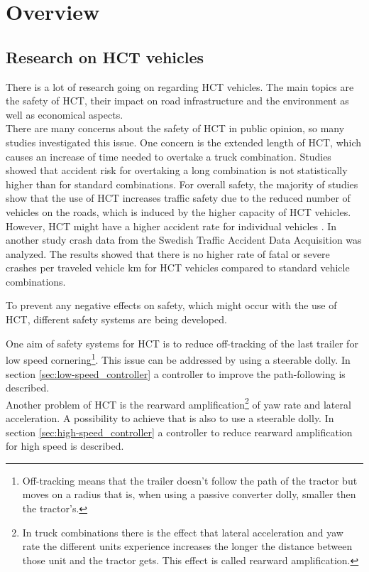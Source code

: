 \documentclass[ExampleMasters.tex]{subfiles}
\begin{document}
\clearpage
{\pagestyle{empty}\cleardoublepage}%
\chapter{Overview}
\label{chap:overview}


\section{Research on \acrlong{HCT} vehicles}
\label{sec:legal_situation}

There is a lot of research going on regarding \gls{HCT} vehicles. The main topics are the safety of \gls{HCT}, their impact on road infrastructure and the environment as well as economical aspects.\\
There are many concerns about the safety of \gls{HCT} in public opinion, so many studies investigated this issue. One concern is the extended length of \gls{HCT}, which causes an increase of time needed to overtake a truck combination. Studies showed that accident risk for overtaking a long combination is not statistically higher than for standard combinations\cite{EMS}.
For overall safety, the majority of studies show that the use of \gls{HCT} increases traffic safety due to the reduced number of vehicles on the roads, which is induced by the higher capacity of \gls{HCT} vehicles. However, \gls{HCT} might have a higher accident rate for individual vehicles \cite{EMS}. In another study crash data from the Swedish Traffic Accident Data Acquisition was analyzed. The results showed that there is no higher rate of fatal or severe crashes per traveled vehicle km for \gls{HCT} vehicles compared to standard vehicle combinations\cite{balint2013correlation}.

To prevent any negative effects on safety, which might occur with the use of \gls{HCT}, different safety systems are being developed.

One aim of safety systems for \gls{HCT} is to reduce off-tracking of the last trailer for low speed cornering\footnote{Off-tracking means that the trailer doesn't follow the path of the tractor but moves on a radius that is, when using a passive converter dolly, smaller then the tractor's.}. This issue can be addressed by using a steerable dolly. In section \ref{sec:low-speed_controller} a controller to improve the path-following is described.\\
Another problem of \gls{HCT} is the rearward amplification\footnote{In truck combinations there is the effect that lateral acceleration and yaw rate the different units experience increases the longer the distance between those unit and the tractor gets. This effect is called rearward amplification.} of yaw rate and lateral acceleration. A possibility to achieve that is also to use a steerable dolly. In section \ref{sec:high-speed_controller} a controller to reduce rearward amplification for high speed is described.\\
\end{document}
